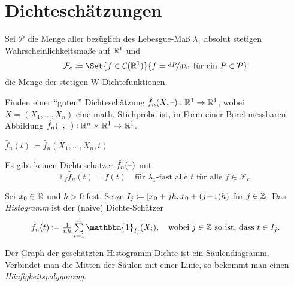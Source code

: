 \documentclass{cheat-sheet}
\newcommand{\E}{\mathbb{E}} %
\newcommand{\ind}{\mathbbm{1}} %
\newcommand{\Cont}{\mathcal{C}} %
\begin{document}

\section{Dichteschätzungen}


\begin{nota}
  Sei $\mathcal{P}$ die Menge aller bezüglich des Lebesgue-Maß $\lambda_1$ absolut stetigen Wahrscheinlichkeitsmaße auf $\mathbb{R}^1$ und
  \[ \mathcal{F}_c \coloneqq \Set{f \in \Cont(\R^1)}{f = \nicefrac{\d P}{\d \lambda_1} \text{ für ein } P \in \mathcal{P}} \]
  die Menge der stetigen W-Dichtefunktionen.
\end{nota}

\begin{ziel}
  Finden einer "`guten"' Dichteschätzung $\hat{f}_n(X, \text{--}) : \mathbb{R}^1 \to \mathbb{R}^1$, wobei $X = (X_1, \ldots, X_n)$ eine math. Stichprobe ist, in Form einer Borel-messbaren Abbildung $\hat{f}_n(\text{--}, \text{--}) : \mathbb{R}^n \times \mathbb{R}^1 \to \mathbb{R}^1$.
\end{ziel}

\begin{nota}
  $\hat{f}_n(t) \coloneqq \hat{f}_n(X_1, \ldots, X_n, t)$
\end{nota}

\begin{lem}
  Es gibt keinen Dichteschätzer $\hat{f}_n(\text{--})$ mit
  \[
    \E_f \hat{f}_n(t) = f(t) \quad
    \text{für $\lambda_1$-fast alle $t$ für alle $f \in \mathcal{F}_c$.}
  \]
\end{lem}


\begin{defn}
  Sei $x_0 \in \mathbb{R}$ und $h > 0$ fest.
  Setze $I_j \coloneqq \left[ x_0 + jh, x_0 + (j\!+\!1) h \right)$ für $j \in \mathbb{Z}$.
  Das \emph{Histogramm} ist der (naive) Dichte-Schätzer
  \[
    \hat{f}_n(t) \coloneqq \tfrac{1}{nh} \sum_{i=1}^n \ind_{I_j}(X_i), \quad
    \text{wobei $j \in \Z$ so ist, dass $t \in I_j$}.
  \]
\end{defn}

\begin{bem}
  Der Graph der geschätzten Histogramm-Dichte ist ein Säulendiagramm.
  Verbindet man die Mitten der Säulen mit einer Linie, so bekommt man einen \emph{Häufigkeitspolygonzug}.
\end{bem}
\end{document}
